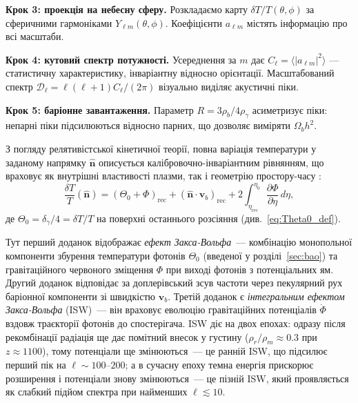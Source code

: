 \medskip
\noindent\textbf{Крок 3: проекція на небесну сферу.}
Розкладаємо карту $\delta T/T(\theta,\phi)$ за сферичними
гармоніками $Y_{\ell m}(\theta,\phi)$. Коефіцієнти $a_{\ell m}$
містять інформацію про всі масштаби.

\medskip
\noindent\textbf{Крок 4: кутовий спектр потужності.}
Усереднення за $m$ дає $C_\ell = \langle |a_{\ell m}|^2 \rangle$ —
статистичну характеристику, інваріантну відносно орієнтації.
Масштабований спектр $\mathcal{D}_\ell = \ell(\ell+1)C_\ell/(2\pi)$
візуально виділяє акустичні піки.

\medskip
\noindent\textbf{Крок 5: баріонне завантаження.}
Параметр $R = 3\rho_b/4\rho_\gamma$ асиметризує піки:
непарні піки підсилюються відносно парних, що дозволяє
виміряти $\Omega_b h^2$.

З погляду релятивістської кінетичної теорії, повна варіація температури у заданому напрямку $\hat{\mathbf{n}}$ описується калібровочно-інваріантним рівнянням, що враховує як внутрішні властивості плазми, так і геометрію простору-часу \cite{hu_sugiyama_1995}:
\begin{equation}\label{eq:cmb_sources_combined}
  \frac{\delta T}{T}(\hat{\mathbf{n}}) = \left( \Theta_0 + \Phi \right)_{\mathrm{rec}} + \left( \hat{\mathbf{n}} \cdot \mathbf{v}_b \right)_{\mathrm{rec}} + 2 \int_{\eta_{\mathrm{rec}}}^{\eta_0} \frac{\partial \Phi}{\partial \eta} \, d\eta,
\end{equation}
де $\Theta_0 = \delta_\gamma/4 = \delta T/T$ на поверхні останнього розсіяння (див.~\eqref{eq:Theta0_def}).

Тут перший доданок відображає \emph{ефект Закса-Вольфа}~---
комбінацію монопольної компоненти збурення температури фотонів
$\Theta_0$ (введеної у розділі~\ref{sec:bao})
та гравітаційного червоного зміщення $\Phi$ при виході фотонів
з потенціальних ям. Другий доданок відповідає за доплерівський
зсув частоти через пекулярний рух баріонної компоненти зі
швидкістю $\mathbf{v}_b$. Третій доданок є \emph{інтегральним
ефектом Закса-Вольфа} (ISW)~--- він враховує еволюцію
гравітаційних потенціалів $\dot{\Phi}$ вздовж траєкторії
фотонів до спостерігача. ISW діє на двох епохах: одразу після рекомбінації
радіація ще дає помітний внесок у густину ($\rho_r/\rho_m \approx 0.3$ при $z\approx1100$),
тому потенціали ще змінюються~--- це ранній ISW, що підсилює
перший пік на $\ell \sim 100$--$200$; а в сучасну епоху темна енергія
прискорює розширення і потенціали знову змінюються~---
це пізній ISW, який проявляється як слабкий підйом спектра
при найменших $\ell \lesssim 10$.

